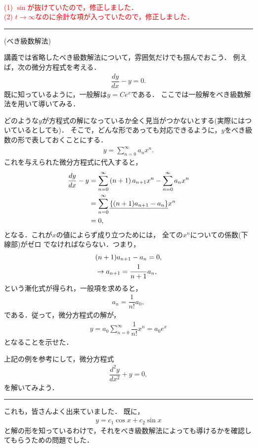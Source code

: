 \documentclass[11pt,a4]{jsarticle}
\numberwithin{equation}{section}
\begin{document}
\vspace*{.2cm}
\noindent
\textcolor{red}{
\\[.2cm]
(1) $\sin$が抜けていたので，修正しました．\\
(2) $t\to \infty$なのに余計な項が入っていたので，修正しました． 
}

\newpage
%
\hrule
\enshu (べき級数解法)
%

講義では省略したべき級数解法について，雰囲気だけでも掴んでおこう．
例えば，次の微分方程式を考える．
\begin{align*}
  \dfrac{dy}{dx} - y = 0. 
\end{align*}
既に知っているように，一般解は$y=Ce^{x}$である．
ここでは一般解をべき級数解法を用いて導いてみる．

どのような$y$が方程式の解になっているか全く見当がつかないとする(実際にはついているとしても)．
そこで，どんな形であっても対応できるように，$y$をべき級数の形で表しておくことにする．
\begin{align*}
  y = \sum_{n=0}^{\infty} a_{n}x^{n}. 
\end{align*}
これを与えられた微分方程式に代入すると，
\begin{align*}
  \dfrac{dy}{dx} - y &= \sum_{n=0}^{\infty}\left(n+1\right)a_{n+1}x^n 
                        - \sum_{n=0}^{\infty}a_n x^{n} \notag \\
                     &= \sum_{n=0}^{\infty}\underline{\left\{(n+1)a_{n+1}-a_n\right\}}x^{n} \notag \\
                     &= 0, 
\end{align*}
となる．これが$x$の値によらず成り立つためには，
全ての$x^{n}$についての係数(下線部)がゼロ
でなければならない．つまり，
\begin{align*}
  &(n+1)a_{n+1} - a_n = 0, \notag \\
  &\rightarrow a_{n+1} = \dfrac{1}{n+1}a_{n},
\end{align*}
という漸化式が得られ，一般項を求めると，
\begin{align*}
 a_n = \dfrac{1}{n!}a_0,
\end{align*}
である．従って，微分方程式の解が，
\begin{align*}
  y = a_0 \sum_{n=0}^{\infty}\dfrac{1}{n!}x^n = a_{0}e^{x} 
\end{align*}
となることを示せた．

上記の例を参考にして，微分方程式
\begin{align*}
  \dfrac{d^2y}{dx^2} + y = 0,
\end{align*}
を解いてみよう．
\vspace*{.2cm}
\hrule
\vspace*{.2cm}
%
これも，皆さんよく出来ていました．
既に，
\begin{align*}
  y = c_1 \cos x + c_2 \sin x 
\end{align*}
と解の形を知っているわけで，それをべき級数解法によっても導けるかを確認してもらうための問題でした．
\end{document}
